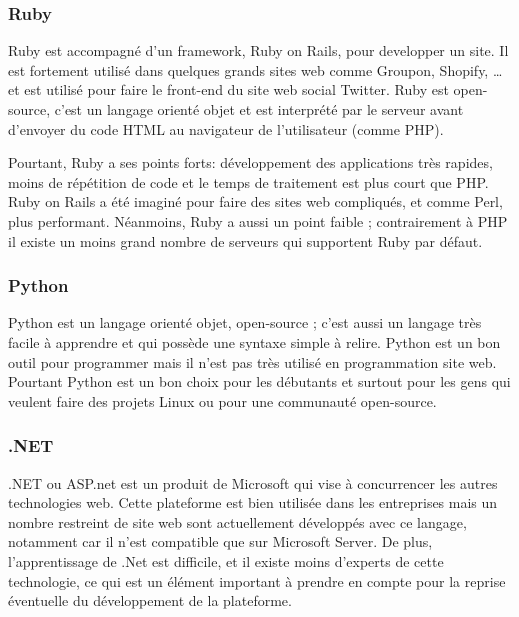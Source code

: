         \subsubsection{Ruby}
        \label{subsubsec:ruby}
        Ruby est accompagné d’un framework, Ruby on Rails, pour developper un site. Il est
        fortement utilisé dans quelques grands sites web comme Groupon, Shopify, … et est utilisé pour faire
        le front-end du site web social Twitter. Ruby est open-source, c’est un langage orienté objet et est
        interprété par le serveur avant d’envoyer du code HTML au navigateur de l’utilisateur (comme PHP).

        Pourtant, Ruby a ses points forts: développement des applications très rapides, moins de répétition
        de code et le temps de traitement est plus court que PHP. Ruby on Rails a été imaginé pour faire des
        sites web compliqués, et comme Perl, plus performant. Néanmoins, Ruby a aussi un point faible ;
        contrairement à PHP il existe un moins grand nombre de serveurs qui supportent Ruby par défaut.

        \subsubsection{Python}
        \label{subsubsec:python}
        Python est un langage orienté objet, open-source ; c’est aussi un langage très facile à apprendre
        et qui possède une syntaxe simple à relire. Python est un bon outil pour programmer mais il n’est
        pas très utilisé en programmation site web. Pourtant Python est un bon choix pour les débutants et
        surtout pour les gens qui veulent faire des projets Linux ou pour une communauté open-source.

        \subsubsection{.NET}
        \label{subsubsec:dotnet}
        .NET ou ASP.net est un produit de Microsoft qui vise à concurrencer les autres technologies web.
        Cette plateforme est bien utilisée dans les entreprises mais un nombre restreint de site web
        sont actuellement développés avec ce langage, notamment car il n’est compatible que sur Microsoft Server.
        De plus, l’apprentissage de .Net est difficile, et il existe moins d’experts de cette technologie,
        ce qui est un élément important à prendre en compte pour la reprise éventuelle du développement de la plateforme.




